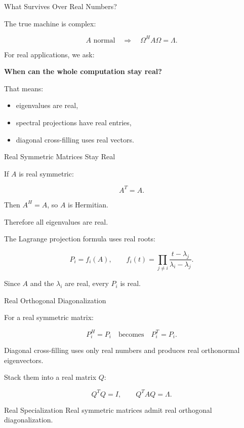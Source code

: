 \documentclass[10pt]{beamer}
\theoremstyle{definition}
\newcommand{\x}[1]{\alert{\textbf{#1}}}
\begin{document}
\begin{frame}{What Survives Over Real Numbers?}

The true machine is complex:

$$
A\text{ normal}
\quad\Longrightarrow\quad
\Omega^HA\Omega=\Lambda.
$$

\vfill\pause

For real applications, we ask:

\begin{center}
\x{When can the whole computation stay real?}
\end{center}

\vfill

That means:

\begin{itemize}
\item eigenvalues are real,
\item spectral projections have real entries,
\item diagonal cross-filling uses real vectors.
\end{itemize}

\end{frame}


\begin{frame}{Real Symmetric Matrices Stay Real}

If $A$ is real symmetric:

$$
A^T=A.
$$

\vfill\pause

Then $A^H=A$, so $A$ is Hermitian.

\vfill

Therefore all eigenvalues are real.

\vfill\pause

The Lagrange projection formula uses real roots:

$$
P_i=f_i(A),
\qquad
f_i(t)=\prod_{j\ne i}\frac{t-\lambda_j}{\lambda_i-\lambda_j}.
$$

\vfill

Since $A$ and the $\lambda_i$ are real, every $P_i$ is real.

\end{frame}


\begin{frame}{Real Orthogonal Diagonalization}

For a real symmetric matrix:

$$
P_i^H=P_i
\quad\text{becomes}\quad
P_i^T=P_i.
$$

\vfill\pause

Diagonal cross-filling uses only real numbers and produces real orthonormal eigenvectors.

\vfill

Stack them into a real matrix $Q$:

$$
Q^TQ=I,
\qquad
Q^TAQ=\Lambda.
$$

\vfill

\begin{block}{Real Specialization}
Real symmetric matrices admit real orthogonal diagonalization.
\end{block}

\end{frame}
\end{document}
